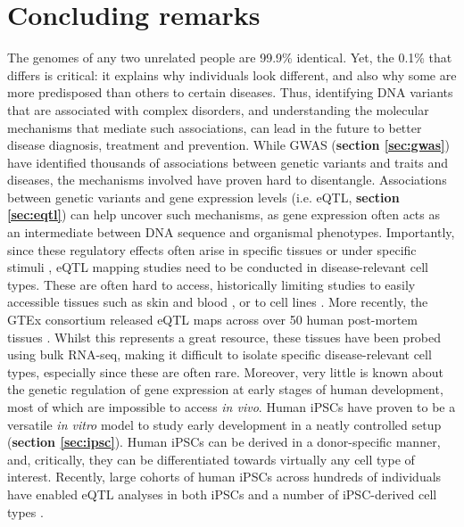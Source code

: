 
\chapter{Concluding remarks}  %
\label{chapter6}

The genomes of any two unrelated people are 99.9\% identical.
Yet, the 0.1\% that differs is critical: it explains why individuals look different, and also why some are more predisposed than others to certain diseases. 
Thus, identifying DNA variants that are associated with complex disorders, and understanding the molecular mechanisms that mediate such associations, can lead in the future to better disease diagnosis, treatment and prevention.
While GWAS (\textbf{section \ref{sec:gwas}}) have identified thousands of associations between genetic variants and traits and diseases, the mechanisms involved have proven hard to disentangle.
Associations between genetic variants and gene expression levels (i.e. eQTL, \textbf{section 
\ref{sec:eqtl}}) can help uncover such mechanisms, as gene expression often acts as an intermediate between DNA sequence and organismal phenotypes.
Importantly, since these regulatory effects often arise in specific tissues or under specific stimuli \cite{alasoo2018shared}, eQTL mapping studies need to be conducted in disease-relevant cell types. 
These are often hard to access, historically limiting studies to easily accessible tissues such as skin and blood \cite{fairfax2014innate, westra2014genome}, or to cell lines \cite{gibson2005quantitative}.
More recently, the GTEx consortium released eQTL maps across over 50 human post-mortem tissues \cite{aguet2019gtex}.
Whilst this represents a great resource, these tissues have been probed using bulk RNA-seq, making it difficult to isolate specific disease-relevant cell types, especially since these are often rare.
Moreover, very little is known about the genetic regulation of gene expression at early stages of human development, most of which are impossible to access \textit{in vivo}.
Human iPSCs have proven to be a versatile \textit{in vitro} model to study early development in a neatly controlled setup (\textbf{section \ref{sec:ipsc}}).
Human iPSCs can be derived in a donor-specific manner, and, critically, they can be differentiated towards virtually any cell type of interest.
Recently, large cohorts of human iPSCs across hundreds of individuals have enabled eQTL analyses in both iPSCs and a number of iPSC-derived cell types \cite{kilpinen2017common, schwartzentruber2018molecular}. 


